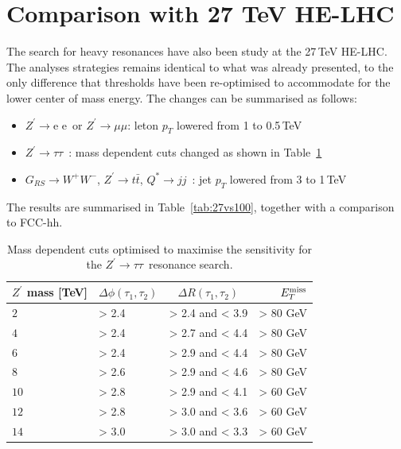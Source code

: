 \documentclass[a4paper,11pt]{article}
\newcommand{\Zp}{\ensuremath{Z^{\prime}}}
\newcommand*{\Zptata}{\ensuremath{Z^{\prime}\rightarrow \tau\tau}}
\newcommand*{\Zpee}{\ensuremath{Z^{\prime}\rightarrow \text{e e}}}
\newcommand*{\Zpmumu}{\ensuremath{Z^{\prime}\rightarrow \mu\mu}}
\newcommand*{\Zptt}{\ensuremath{Z^{\prime} \rightarrow \ttbar}}
\newcommand*{\met}{\ensuremath{E_{T}^{\rm{miss}}}}
\newcommand*{\qjj}{\ensuremath{Q^{*} \rightarrow jj}}
\newcommand*{\rsg}{\ensuremath{G_{RS} \rightarrow W^+W^-}}
\newcommand*{\ttbar}{\ensuremath{t\bar{t}}}
\begin{document}
\section{Comparison with 27 TeV HE-LHC}
\label{sec:ana27tev}
The search for heavy resonances have also been study at the 27\,TeV HE-LHC. The analyses strategies remains identical to what was already presented, to the only difference that thresholds have been re-optimised to accommodate for the lower center of mass energy. The changes can be summarised as follows:
\begin{itemize}
\item \Zpee\ or \Zpmumu : leton $p_T$ lowered from 1 to 0.5\,TeV
\item \Zptata\ : mass dependent cuts changed as shown in Table~\ref{tab:leptonicresonances:tautau27}
\item \rsg, \Zptt, \qjj\ : jet $p_T$ lowered from 3 to 1\,TeV
\end{itemize}

The results are summarised in Table~\ref{tab:27vs100}, together with a comparison to FCC-hh.

\begin{table}[htbp]
   \centering
\begin{tabular}{|l|l|c|r|}
  \hline
  \hline
   $\Zp$ mass [TeV] &  $\Delta \phi(\tau_1, \tau_2)$&  $\Delta R(\tau_1, \tau_2)$ & $\met$\\
  \hline
   $2$ & > 2.4 & > 2.4 and < 3.9 & > 80 GeV\\
   $4$ & > 2.4 & > 2.7 and < 4.4 & > 80 GeV\\
   $6$ & > 2.4 & > 2.9 and < 4.4 & > 80 GeV\\
   $8$ & > 2.6 & > 2.9 and < 4.6 & > 80 GeV\\
  $10$ & > 2.8 & > 2.9 and < 4.1 & > 60 GeV\\
  $12$ & > 2.8 & > 3.0 and < 3.6 & > 60 GeV\\
  $14$ & > 3.0 & > 3.0 and < 3.3 & > 60 GeV\\
  \hline
  \hline
  \end{tabular}
  \caption{Mass dependent cuts optimised to maximise the sensitivity for the \Zptata\ resonance search.}
  \label{tab:leptonicresonances:tautau27}
\end{table}
\end{document}
